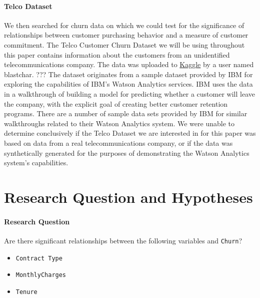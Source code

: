 \documentclass[man, floatsintext]{apa6}
\begin{document}
\hspace{0.5mm}

\paragraph{Telco Dataset}

We then searched for churn data on which we could test for the significance of relationships between customer purchasing behavior and a measure of customer commitment. The Telco Customer Churn Dataset we will be using throughout this paper contains information about the customers from an unidentified telecommunications company. The data was uploaded to \href{https://www.kaggle.com/blastchar/telco-customer-churn}{Kaggle} by a user named blastchar. \cite{blastchar_2018} ??? The dataset originates from a sample dataset provided by IBM for exploring the capabilities of IBM's Watson Analytics services. IBM uses the data in a walkthrough of building a model for predicting whether a customer will leave the company, with the explicit goal of creating better customer retention programs. \cite{ibm_telco_2015} There are a number of sample data sets provided by IBM for similar walkthroughs related to their Watson Analytics system. \cite{ibm_data_2015} We were unable to determine conclusively if the Telco Dataset we are interested in for this paper was based on data from a real telecommunications company, or if the data was synthetically generated for the purposes of demonstrating the Watson Analytics system's capabilities.

\section{Research Question and Hypotheses}
\paragraph{Research Question}

Are there significant relationships between the following variables and \texttt{Churn}?
\begin{itemize}
\item{\texttt{Contract Type}}
\item{\texttt{MonthlyCharges}}
\item{\texttt{Tenure}}
\end{itemize}
\end{document}
